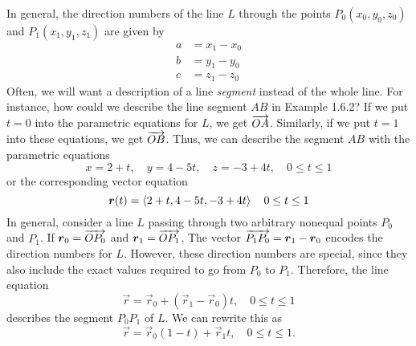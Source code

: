 In general, the direction numbers of the line \(L\) through the points \(P_0(x_0,y_0,z_0)\) and \(P_1(x_1,y_1,z_1)\) are given by
\begin{align*}
    a &= x_1-x_0 \\
    b &= y_1-y_0 \\
    c &= z_1-z_0
\end{align*}
Often, we will want a description of a line \textit{segment} instead of the whole line. For instance, how could we describe the line segment \(AB\) in Example 1.6.2? If we put \(t=0\) into the parametric equations for \(L\), we get \(\overrightarrow{OA}\). Similarly, if we put \(t=1\) into these equations, we get \(\overrightarrow{OB}\). Thus, we can describe the segment \(AB\) with the parametric equations
\[x=2+t, \quad y=4-5t, \quad z=-3+4t, \quad 0\leq t \leq 1\]
or the corresponding vector equation
\[\boldsymbol{r}(t)=\left\langle2+t, 4-5t, -3+4t\right\rangle \quad 0\leq t \leq 1\]
In general, consider a line \(L\) passing through two arbitrary nonequal points \(P_0\) and \(P_1\). If \(\boldsymbol{r}_0=\overrightarrow{OP_0}\) and \(\boldsymbol{r}_1=\overrightarrow{OP_1}\), The vector \(\overrightarrow{P_1P_0}=\boldsymbol{r}_1-\boldsymbol{r}_0\) encodes the direction numbers for \(L\). However, these direction numbers are special, since they also include the exact values required to go from \(P_0\) to \(P_1\). Therefore, the line equation
\[\vec r = \vec r_0+(\vec r_1-\vec r_0)t, \quad 0\leq t\leq 1\]
describes the segment \(P_0P_1\) of \(L\). We can rewrite this as
\[\vec r = \vec r_0 (1 - t)+\vec r_1t, \quad 0\leq t \leq 1.\]
